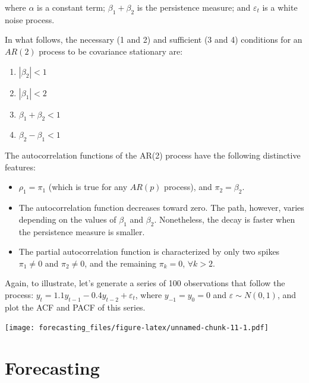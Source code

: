 \documentclass[
  12pt,
  oneside]{book}
\providecommand{\tightlist}{%
  \setlength{\itemsep}{0pt}\setlength{\parskip}{0pt}}
\begin{document}
where \(\alpha\) is a constant term; \(\beta_1+\beta_2\) is the persistence measure; and \(\varepsilon_t\) is a white noise process.

In what follows, the necessary (1 and 2) and sufficient (3 and 4) conditions for an \(AR(2)\) process to be covariance stationary are:

\begin{enumerate}
\def\labelenumi{\arabic{enumi}.}
\tightlist
\item
  \(|\beta_2| < 1\)
\item
  \(|\beta_1| < 2\)
\item
  \(\beta_1 + \beta_2 < 1\)
\item
  \(\beta_2 - \beta_1 < 1\)
\end{enumerate}

The autocorrelation functions of the AR(2) process have the following distinctive features:

\begin{itemize}
\tightlist
\item
  \(\rho_1 = \pi_1\) (which is true for any \(AR(p)\) process), and \(\pi_2 = \beta_2\).
\item
  The autocorrelation function decreases toward zero. The path, however, varies depending on the values of \(\beta_1\) and \(\beta_2\). Nonetheless, the decay is faster when the persistence measure is smaller.
\item
  The partial autocorrelation function is characterized by only two spikes \(\pi_1 \neq 0\) and \(\pi_2 \neq 0\), and the remaining \(\pi_k = 0\), \(\forall k > 2\).
\end{itemize}

Again, to illustrate, let's generate a series of 100 observations that follow the process: \(y_t=1.1y_{t-1}-0.4y_{t-2}+\varepsilon_t\), where \(y_{-1}=y_0=0\) and \(\varepsilon\sim N(0,1)\), and plot the ACF and PACF of this series.

\texttt{[image: forecasting\_files/figure-latex/unnamed-chunk-11-1.pdf]}

\hypertarget{forecasting-1}{%
\section{Forecasting}\label{forecasting-1}}
\end{document}
